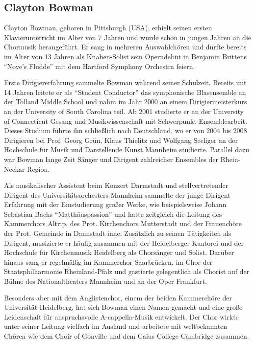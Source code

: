\documentclass[11pt, ngermanm, titlepage]{article}
\begin{document}
\begin{multicols}{2}
	\section*{Clayton Bowman}
	Clayton Bowman, geboren in Pittsburgh (USA), erhielt seinen ersten Klavierunterricht im Alter von 7 Jahren und wurde schon in jungen Jahren an die Chormusik herangeführt. Er sang in mehreren Auswahlchören und durfte bereits im Alter von 13 Jahren als Knaben-Solist sein Operndebüt in Benjamin Brittens "`Noye's Fludde"' mit dem Hartford Symphony Orchestra feiern.
	
	Erste Dirigiererfahrung sammelte Bowman während seiner Schulzeit. Bereits mit 14 Jahren leitete er als "`Student Conductor"' das symphonische Blasensemble an der Tolland Middle School und nahm im Jahr 2000 an einem Dirigiermeisterkurs an der University of South Carolina teil. Ab 2001 studierte er an der University of Connecticut Gesang und Musikwissenschaft mit Schwerpunkt Ensemblearbeit. Dieses Studium führte ihn schließlich nach Deutschland, wo er von 2004 bis 2008 Dirigieren bei Prof. Georg Grün, Klaus Thielitz und Wolfgang Seeliger an der Hochschule für Musik und Darstellende Kunst Mannheim studierte. Parallel dazu war Bowman lange Zeit Sänger und Dirigent zahlreicher Ensembles der Rhein-Neckar-Region.
	
	Als musikalischer Assistent beim Konzert Darmstadt und stellvertretender Dirigent des Universitätsorchesters Mannheim sammelte der junge Dirigent Erfahrung mit der Einstudierung großer Werke, wie beispielsweise Johann Sebastian Bachs "`Matthäuspassion"' und hatte zeitgleich die Leitung des Kammerchors Altrip, des Prot. Kirchenchors Mutterstadt und der Frauenchöre der Prot. Gemeinde in Dannstadt inne. Zusätzlich zu seinen Tätigkeiten als Dirigent, musizierte er häufig zusammen mit der Heidelberger Kantorei und der Hochschule für Kirchenmusik Heidelberg als Chorsänger und Solist. Darüber hinaus sang er regelmäßig im Kammerchor Saarbrücken, im Chor der Staatsphilharmonie Rheinland-Pfalz und gastierte gelegentlich als Chorist auf der Bühne des Nationaltheaters Mannheim und an der Oper Frankfurt.
	 
	Besonders aber mit dem Anglistenchor, einem der beiden Kammerchöre der Universität Heidelberg, hat sich Bowman einen Namen gemacht und eine große Leidenschaft für anspruchsvolle A-cappella-Musik entwickelt. Der Chor wirkte unter seiner Leitung vielfach im Ausland und arbeitete mit weltbekannten Chören wie dem Choir of Gonville und dem Caius College Cambridge zusammen.
	 

\end{multicols}
\end{document}
